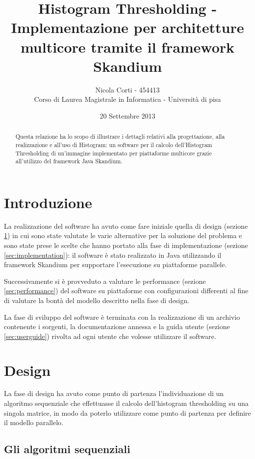 \documentclass[a4paper,10pt]{article}
\title{Histogram Thresholding - Implementazione per architetture multicore tramite il framework Skandium}
\author{Nicola Corti - 454413 \\Corso di Laurea Magistrale in Informatica - Universit\`a di pisa}
\date{20 Settembre 2013}
\begin{document}
\maketitle
 
\begin{abstract}
Questa relazione ha lo scopo di illustrare i dettagli relativi alla progettazione, alla realizzazione e all'uso di \textsf{Histogram}: un software per il calcolo dell'Histogram Thresholding di un'immagine implementato per piattaforme multicore grazie all'utilizzo del framework Java Skandium.
\end{abstract}

\tableofcontents

\section*{Introduzione}

La realizzazione del software ha avuto come fare iniziale quella di design (sezione \ref{sec:design}) in cui sono state valutate le varie alternative per  la soluzione del problema e sono state prese le scelte che hanno portato alla fase di implementazione (sezione \ref{sec:implementation}): il software \`e stato realizzato in Java utilizzando il framework Skandium per supportare l'esecuzione su piattaforme parallele.

Successivamente si \`e provveduto a valutare le performance (sezione \ref{sec:performance}) del software su piattaforme con configurazioni differenti al fine di valutare la bont\`a del modello descritto nella fase di design.

La fase di sviluppo del software \`e terminata con la realizzazione di un archivio contenente i sorgenti, la documentazione annessa e la guida utente (sezione \ref{sec:userguide}) rivolta ad ogni utente che volesse utilizzare il software.

\section{Design}
\label{sec:design}

La fase di design ha avuto come punto di partenza l'individuazione di un algoritmo sequenziale che effettuasse il calcolo dell'histogram thresholding su una singola matrice, in modo da poterlo utilizzare come punto di partenza per definire il modello parallelo.

\subsection{Gli algoritmi sequenziali}
\end{document}

